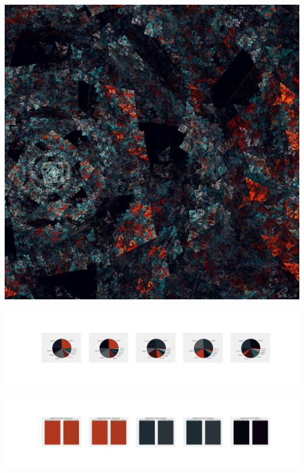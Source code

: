\documentclass[11pt]{article}
\begin{document}
\begin{landscape}
    \begin{center}
    \includegraphics[width=\textwidth]{./nbimg/file (250).jpg}
    \end{center}

    \begin{center}
    \includegraphics[width=250mm]{./nbimg/pie-168.jpg}
    \end{center}

    \begin{center}
    \includegraphics[width=250mm]{./nbimg/peak-168.jpg}
    \end{center}
    


\end{landscape}
\end{document}
